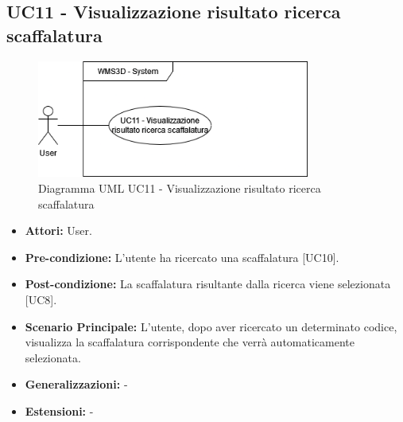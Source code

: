 \subsection{UC11 - Visualizzazione risultato ricerca scaffalatura}
\begin{figure}[H]
  \centering
  \includegraphics[width=0.8\textwidth]{UC_diagrams_11-20/UC11.drawio.png}
   \caption{Diagramma UML UC11 - Visualizzazione risultato ricerca scaffalatura}
\end{figure}
\begin{itemize}
    \item \textbf{Attori:} User.
    \item \textbf{Pre-condizione:} L'utente ha ricercato una scaffalatura [UC10].
    \item \textbf{Post-condizione:} La scaffalatura risultante dalla ricerca viene selezionata [UC8].
    \item \textbf{Scenario Principale:} L'utente, dopo aver ricercato un determinato codice, visualizza la scaffalatura corrispondente che verrà automaticamente selezionata.
    \item \textbf{Generalizzazioni:} -
    \item \textbf{Estensioni:} -
\end{itemize}